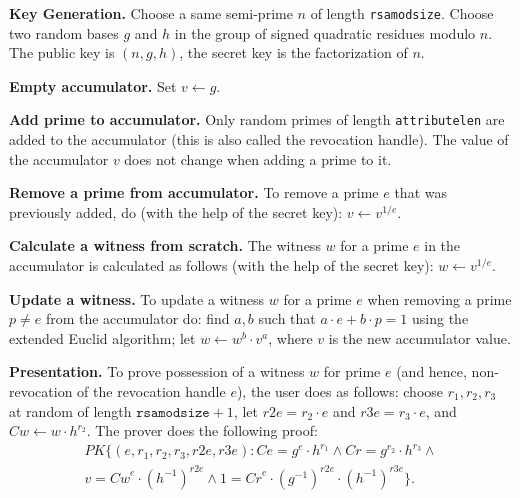 \begin{description}
    \textbf{Key Generation.}
    Choose a same semi-prime $n$ of length \texttt{rsamodsize}.
    Choose two random bases $g$ and $h$ in the group of signed quadratic residues modulo $n$.
    The public key is $(n, g, h)$, the secret key is the factorization of $n$.

    \textbf{Empty accumulator.}
    Set $v\gets g$.

    \textbf{Add prime to accumulator.}
    Only random primes of length \texttt{attributelen} are added to the accumulator
    (this is also called the revocation handle).
    The value of the accumulator $v$ does not change when adding a prime to it.

    \textbf{Remove a prime from accumulator.}
    To remove a prime $e$ that was previously added, do (with the help of the secret key):
    $v\gets v^{1/e}$.

    \textbf{Calculate a witness from scratch.}
    The witness $w$ for a prime $e$ in the accumulator is calculated as follows
    (with the help of the secret key):
    $w\gets v^{1/e}$.

    \textbf{Update a witness.}
    To update a witness $w$ for a prime $e$ when removing a prime $p\neq e$
    from the accumulator do:
    find $a,b$ such that $a\cdot e + b\cdot p = 1$ using the extended Euclid algorithm;
    let $w\gets w^b \cdot v^a$, where $v$ is the new accumulator value.

    \textbf{Presentation.}
    To prove possession of a witness $w$ for prime $e$ (and hence, non-revocation of the
    revocation handle $e$), the user does as follows:
    choose $r_1, r_2, r_3$ at random of length $\texttt{rsamodsize}+1$,
    let $\textit{r2e}=r_2\cdot e$ and $\textit{r3e}=r_3\cdot e$,
    and $\textit{Cw}\gets w\cdot h^{r_2}$.
    The prover does the following proof:
    \begin{align*}
     \mathit{PK}\lbrace (e, r_1, r_2, r_3, \textit{r2e}, \textit{r3e}):
        \textit{Ce} = g^e \cdot h^{r_1} \wedge
        \textit{Cr} = g^{r_2} \cdot h^{r_3} \wedge\\
        v = \textit{Cw}^e \cdot (h^{-1})^{\textit{r2e}} \wedge
        1 = \textit{Cr}^e \cdot (g^{-1})^{\textit{r2e}}\cdot(h^{-1})^{\textit{r3e}}
     \rbrace.
    \end{align*}

\end{description}

